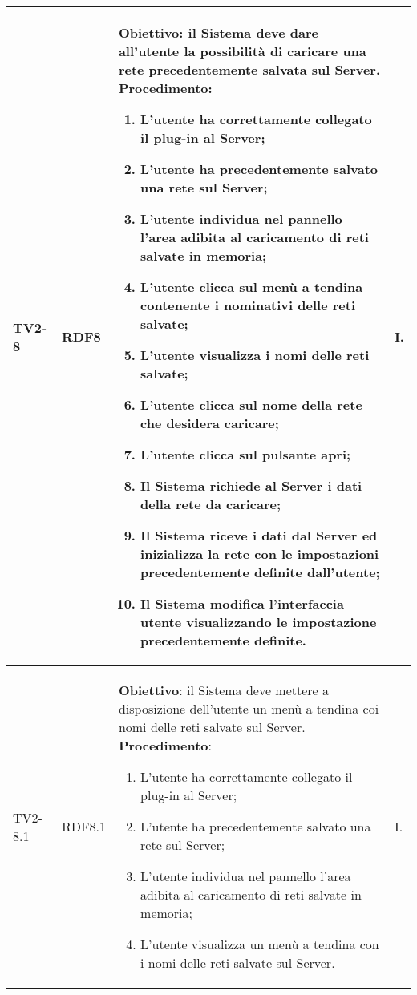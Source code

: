 \begin{longtable}{|C{.15\textwidth}|C{.13\textwidth}|m{.52\textwidth}|C{.08\textwidth}|}
TV2-8 & RDF8 &
	\textbf{Obiettivo}: il Sistema deve dare all'utente la possibilità di caricare una rete precedentemente salvata sul Server. \newline
	\textbf{Procedimento}:
	\begin{enumerate}
		\item L'utente ha correttamente collegato il plug-in al Server;
		\item L'utente ha precedentemente salvato una rete sul Server;
		\item L'utente individua nel pannello l'area adibita al caricamento di reti salvate in memoria;
		\item L'utente clicca sul menù a tendina contenente i nominativi delle reti salvate;
		\item L'utente visualizza i nomi delle reti salvate;
		\item L'utente clicca sul nome della rete che desidera caricare;
		\item L'utente clicca sul pulsante apri;
		\item Il Sistema richiede al Server i dati della rete da caricare;
		\item Il Sistema riceve i dati dal Server ed inizializza la rete con le impostazioni precedentemente definite dall'utente;
		\item Il Sistema modifica l'interfaccia utente visualizzando le impostazione precedentemente definite.
	\end{enumerate}
	& I. \\
\hline

TV2-8.1 & RDF8.1 &
	\textbf{Obiettivo}: il Sistema deve mettere a disposizione dell'utente un menù a tendina coi nomi delle reti salvate sul Server. \newline
	\textbf{Procedimento}:
	\begin{enumerate}
		\item L'utente ha correttamente collegato il plug-in al Server;
		\item L'utente ha precedentemente salvato una rete sul Server;
		\item L'utente individua nel pannello l'area adibita al caricamento di reti salvate in memoria;
		\item L'utente visualizza un menù a tendina con i nomi delle reti salvate sul Server.
	\end{enumerate}
	& I. \\
\hline


\end{longtable}
